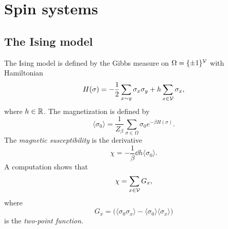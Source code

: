 


\section{Spin systems}

\subsection{The Ising model}

The Ising model is defined by the Gibbs measure on $\Omega = \{ \pm 1 \}^{\mathcal{V}}$
with Hamiltonian
\begin{equation}
H(\sigma) = -\frac{1}{2} \sum_{x \sim y} \sigma_x \sigma_y + h \sum_{x\in\mathcal{V}} \sigma_x,
\end{equation}
where $h \in {\mathbb R}$.
The magnetization is defined by
\begin{equation}
\langle \sigma_0 \rangle = \frac{1}{Z_\beta} \sum_{\sigma\in\Omega} \sigma_0 e^{-\beta H(\sigma)}.
\end{equation}
The \emph{magnetic susceptibility} is the derivative
\begin{equation}
\chi
	=
-\frac{1}{\beta} \dd{}{h} \langle \sigma_0 \rangle.
\end{equation}
A computation shows that
\begin{equation}
\chi = \sum_{x\in\mathcal{V}} G_x,
\end{equation}
where
\begin{equation}
G_x = \Big(\langle \sigma_0 \sigma_x \rangle - \langle \sigma_0 \rangle \langle \sigma_x \rangle\Big)
\end{equation}
is the \emph{two-point function}.


